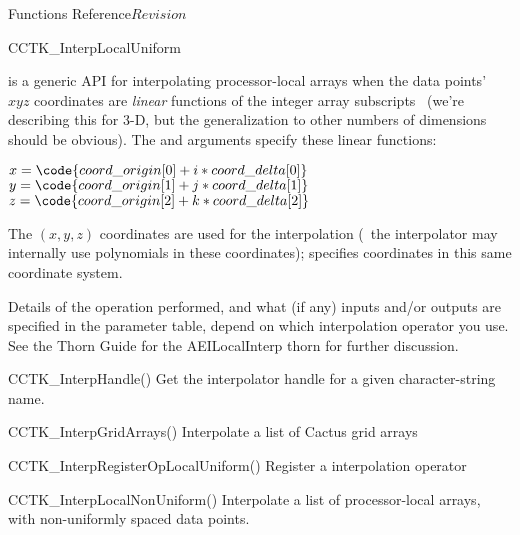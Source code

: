 \begin{cactuspart}{ Functions Reference}{}{$Revision$}
\begin{FunctionDescription}{CCTK\_InterpLocalUniform}
\begin{Discussion}
 is a generic API for interpolating
processor-local arrays when the data points'~$xyz$ coordinates are
{\em linear\/} functions of the integer array subscripts~
(we're describing this for 3-D, but the generalization to other numbers
of dimensions should be obvious).  The  and
 arguments specify these linear functions:
\begin{flushleft}
$x = \code{coord\_origin[0] + i*coord\_delta[0]}$ \\
$y = \code{coord\_origin[1] + j*coord\_delta[1]}$ \\
$z = \code{coord\_origin[2] + k*coord\_delta[2]}$ %
\end{flushleft}
The $(x,y,z)$ coordinates are used for the interpolation
(\ie{}~the interpolator may internally use polynomials in these
coordinates);  specifies coordinates in this
same coordinate system.

Details of the operation performed, and what (if any) inputs and/or
outputs are specified in the parameter table, depend on which interpolation
operator you use.  See the Thorn Guide for the AEILocalInterp thorn for
further discussion.
\end{Discussion}

\begin{SeeAlsoSection}
\begin{SeeAlso}{CCTK\_InterpHandle()}
Get the interpolator handle for a given character-string name.
\end{SeeAlso}
\begin{SeeAlso}{CCTK\_InterpGridArrays()}
Interpolate a list of Cactus grid arrays
\end{SeeAlso}
\begin{SeeAlso}{CCTK\_InterpRegisterOpLocalUniform()}
\mbox{}
Register a  interpolation operator
\end{SeeAlso}
\begin{SeeAlso}{CCTK\_InterpLocalNonUniform()}
Interpolate a list of processor-local arrays,
with non-uniformly spaced data points.
\end{SeeAlso}
\end{SeeAlsoSection}


\end{FunctionDescription}
\end{cactuspart}
